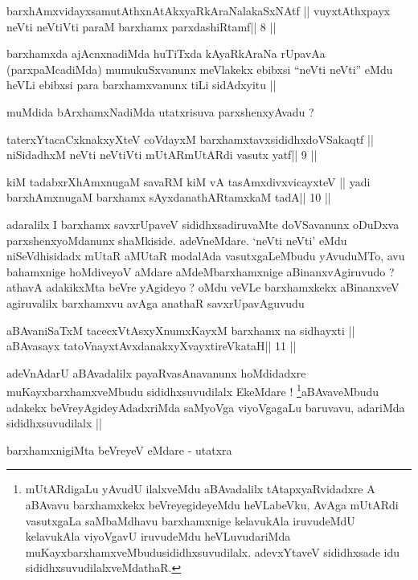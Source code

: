 \begin{shl}
barxhAmxvidayxsamutAthxnAtAkxyaRkAraNalakaSxNAtf ||
vuyxtAthxpayx neVti neVtiVti paraM barxhamx parxdashiRtamf\hfill || 8 ||
\end{shl}

\begin{artha}
barxhamxda ajAcnxnadiMda huTiTxda kAyaRkAraNa rUpavAa (parxpaMcadiMda)
mumukuSxvanunx meVlakekx ebibxsi ``neVti neVti'' eMdu heVLi ebibxsi
para barxhamxvanunx tiLi sidAdxyitu ||

muMdida bArxhamxNadiMda utatxrisuva parxshenxyAvadu ?
\end{artha}

\begin{shl}
taterxYtacaCxknakxyXteV coVdayxM barxhamxtavxsididhxdoVSakaqtf ||
niSidadhxM neVti neVtiVti mUtARmUtARdi vasutx yatf\hfill || 9 ||
\end{shl}

\begin{shl}
kiM tadabxrXhAmxnugaM savaRM kiM vA tasAmxdivxvicayxteV ||
yadi barxhAmxnugaM barxhamx sAyxdanathARtamxkaM tadA\hfill || 10 ||
\end{shl}

\begin{artha}
adaralilx I barxhamx savxrUpaveV sididhxsadiruvaMte doVSavanunx
oDuDxva parxshenxyoMdanunx shaMkiside. adeVneMdare. `neVti neVti' eMdu
niSeVdhisidadx mUtaR aMUtaR modalAda vasutxgaLeMbudu yAvuduMTo, avu
bahamxnige hoMdiveyoV aMdare aMdeMbarxhamxnige aBinanxvAgiruvudo ?
athavA adakikxMta beVre yAgideyo ? oMdu veVLe barxhamxkekx  aBinanxveV
agiruvalilx barxhamxvu avAga anathaR savxrUpavAguvudu 
\end{artha}

\begin{shl}
aBAvaniSaTxM tacecxVtAsxyXnumxKayxM barxhamx na sidhayxti ||
aBAvasayx tatoV\s nayxtAvxdanakxyXvayxtireVkataH\hfill || 11 ||
\end{shl}

\begin{artha}
adeVnAdarU aBAvadalilx payaRvasAnavanunx hoMdidadxre
muKayxbarxhamxveMbudu sididhxsuvudilalx EkeMdare
! \footnote[1]{mUtARdigaLu yAvudU ilalxveMdu aBAvadalilx
  tAtapxyaRvidadxre A aBAvavu barxhamxkekx beVreyegideyeMdu
  heVLabeVku, AvAga mUtARdi vasutxgaLa saMbaMdhavu barxhamxnige
  kelavukAla iruvudeMdU kelavukAla viyoVgavU iruvudeMdu heVLuvudariMda
  muKayxbarxhamxveMbudusididhxsuvudilalx. adevxYtaveV sididhxsade idu
  sididhxsuvudilalxveMdathaR.}aBAvaveMbudu adakekx beVreyAgideyAdadxriMda saMyoVga
viyoVgagaLu baruvavu, adariMda sididhxsuvudilalx ||

barxhamxnigiMta beVreyeV eMdare - utatxra
\end{artha}

